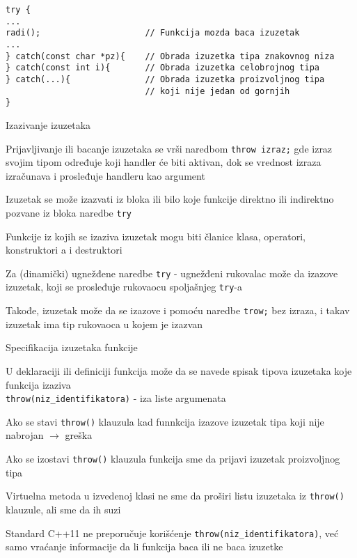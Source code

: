 \documentclass{article}
\newenvironment{xitemize}{%
    
    \itemize
    \larger
}{%
    \enditemize
}
\let\olditemize\itemize
\let\endolditemize\enditemize
\renewenvironment{itemize}{%
    \smaller
    \olditemize
}{%
    \endolditemize
}
\providecommand{\inlinecode}[1]{\texttt{#1}}
\begin{document}
\begin{xitemize}
\begin{itemize}
    \begin{lstlisting}
try {
...
radi();                     // Funkcija mozda baca izuzetak
...
} catch(const char *pz){    // Obrada izuzetka tipa znakovnog niza
} catch(const int i){       // Obrada izuzetka celobrojnog tipa
} catch(...){               // Obrada izuzetka proizvoljnog tipa    
                            // koji nije jedan od gornjih
}
    \end{lstlisting}
\end{itemize}
\item Izazivanje izuzetaka
\begin{itemize}
    \item Prijavljivanje ili bacanje izuzetaka se vrši naredbom \inlinecode{throw izraz;} gde izraz svojim tipom određuje koji handler će biti aktivan, dok se vrednost izraza izračunava i prosleđuje handleru kao argument
    \item Izuzetak se može izazvati iz bloka ili bilo koje funkcije direktno ili indirektno pozvane iz bloka naredbe \inlinecode{try}
    \item Funkcije iz kojih se izaziva izuzetak mogu biti članice klasa, operatori, konstruktori a i destruktori
    \item Za (dinamički) ugnežđene naredbe \inlinecode{try} - ugnežđeni rukovalac može da izazove izuzetak, koji se prosleđuje rukovaocu spoljašnjeg \inlinecode{try}-a
    \item Takođe, izuzetak može da se izazove i pomoću naredbe \inlinecode{trow;} bez izraza, i takav izuzetak ima tip rukovaoca u kojem je izazvan
\end{itemize}
\item Specifikacija izuzetaka funkcije
\begin{itemize}
    \item U deklaraciji ili definiciji funkcija može da se navede spisak tipova izuzetaka koje funkcija izaziva\\
    \inlinecode{throw(niz\_identifikatora)} - iza liste argumenata
    \item Ako se stavi \inlinecode{throw()} klauzula kad funnkcija izazove izuzetak tipa koji nije nabrojan $\rightarrow$ greška
    \item Ako se izostavi \inlinecode{throw()} klauzula funkcija sme da prijavi izuzetak proizvoljnog tipa
    \item Virtuelna metoda u izvedenoj klasi ne sme da proširi listu izuzetaka iz  \inlinecode{throw()} klauzule, ali sme da ih suzi
    \item Standard C++11 ne preporučuje korišćenje \inlinecode{throw(niz\_identifikatora)}, već samo vraćanje informacije da li funkcija baca ili ne baca izuzetke

\end{itemize}
\end{xitemize}
\end{document}
